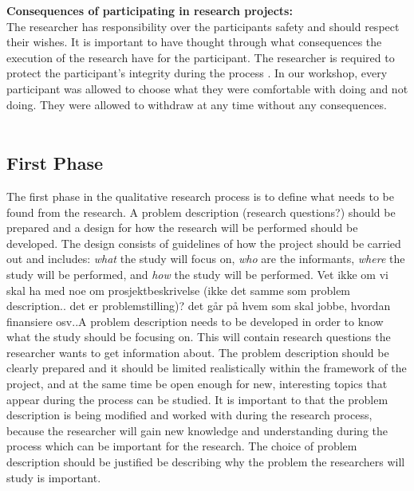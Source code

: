\textbf{Consequences of participating in research projects:}\\
The researcher has responsibility over the participants safety and should respect their wishes. It is important to have thought through what consequences the execution of the research have for the participant. The researcher is required to protect the participant's integrity during the process \cite{qualitative}. In our workshop, every participant was allowed to choose what they were comfortable with doing and not doing. They were allowed to withdraw at any time without any consequences.  \\ \\
\subsection{First Phase} 
The first phase in the qualitative research process is to define what needs to be found from the research. A problem description (research questions?) should be prepared and a design for how the research will be performed should be developed. The design consists of guidelines of how the project should be carried out and includes: \emph{what} the study will focus on, \emph{who} are the informants, \emph{where} the study will be performed, and \emph{how} the study will be performed. Vet ikke om vi skal ha med noe om prosjektbeskrivelse (ikke det samme som problem description.. det er problemstilling)? det går på hvem som skal jobbe, hvordan finansiere osv..A problem description needs to be developed in order to know what the study should be focusing on. This will contain research questions the researcher wants to get information about. The problem description should be clearly prepared and it should be limited realistically within the framework of the project, and at the same time be open enough for new, interesting topics that appear during the process can be studied. It is important to that the problem description is being modified and worked with during the research process, because the researcher will gain new knowledge and understanding during the process which can be important for the research. The choice of problem description should be justified be describing why the problem the researchers will study is important. 
